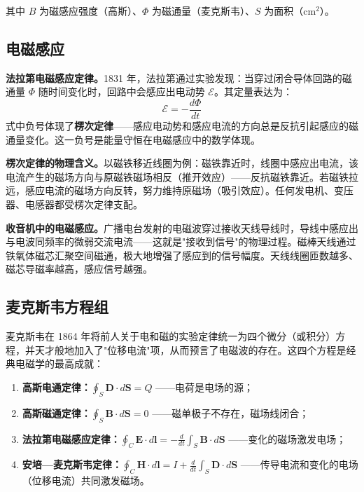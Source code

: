 \documentclass[12pt,UTF8]{ctexbook}
\begin{document}
其中 $B$ 为磁感应强度（高斯）、$\Phi$ 为磁通量（麦克斯韦）、$S$ 为面积（$\mathrm{cm}^2$）。

\subsection{电磁感应}

\textbf{法拉第电磁感应定律。}1831 年，法拉第通过实验发现：当穿过闭合导体回路的磁通量 $\Phi$ 随时间变化时，回路中会感应出电动势 $\mathcal{E}$。其定量表达为：
\[
\boxed{\mathcal{E} = -\frac{d\Phi}{dt}}
\]
式中负号体现了\textbf{楞次定律}——感应电动势和感应电流的方向总是反抗引起感应的磁通量变化。这一负号是能量守恒在电磁感应中的数学体现。

\textbf{楞次定律的物理含义。}以磁铁移近线圈为例：磁铁靠近时，线圈中感应出电流，该电流产生的磁场方向与原磁铁磁场相反（推开效应）——反抗磁铁靠近。若磁铁拉远，感应电流的磁场方向反转，努力维持原磁场（吸引效应）。任何发电机、变压器、电感器都受楞次定律支配。

\textbf{收音机中的电磁感应。}广播电台发射的电磁波穿过接收天线导线时，导线中感应出与电波同频率的微弱交流电流——这就是"接收到信号"的物理过程。磁棒天线通过铁氧体磁芯汇聚空间磁通，极大地增强了感应到的信号幅度。天线线圈匝数越多、磁芯导磁率越高，感应信号越强。

\subsection{麦克斯韦方程组}

麦克斯韦在 1864 年将前人关于电和磁的实验定律统一为四个微分（或积分）方程，并天才般地加入了"位移电流"项，从而预言了电磁波的存在。这四个方程是经典电磁学的最高成就：

\begin{enumerate}
  \item \textbf{高斯电通定律：}$\displaystyle \oint_S \mathbf{D} \cdot d\mathbf{S} = Q$ ——电荷是电场的源；
  \item \textbf{高斯磁通定律：}$\displaystyle \oint_S \mathbf{B} \cdot d\mathbf{S} = 0$ ——磁单极子不存在，磁场线闭合；
  \item \textbf{法拉第电磁感应定律：}$\displaystyle \oint_C \mathbf{E} \cdot d\mathbf{l} = -\frac{d}{dt}\int_S \mathbf{B} \cdot d\mathbf{S}$ ——变化的磁场激发电场；
  \item \textbf{安培—麦克斯韦定律：}$\displaystyle \oint_C \mathbf{H} \cdot d\mathbf{l} = I + \frac{d}{dt}\int_S \mathbf{D} \cdot d\mathbf{S}$ ——传导电流和变化的电场（位移电流）共同激发磁场。
\end{enumerate}
\end{document}
